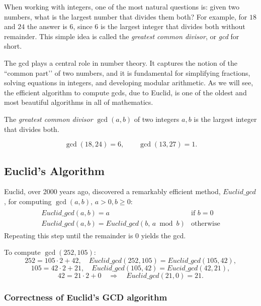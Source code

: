 When working with integers, one of the most natural questions is: given two numbers, 
what is the largest number that divides them both? For example, for $18$ and $24$ the answer is $6$, 
since $6$ is the largest integer that divides both without remainder. 
This simple idea is called the \emph{greatest common divisor}, or \emph{gcd} for short.

The gcd plays a central role in number theory. It captures the notion of 
the ``common part’’ of two numbers, and it is fundamental for simplifying fractions, 
solving equations in integers, and developing modular arithmetic. 
As we will see, the efficient algorithm to compute gcds, due to Euclid, 
is one of the oldest and most beautiful algorithms in all of mathematics.

\begin{definition}
The \emph{greatest common divisor} $\gcd(a,b)$ of two integers $a,b$ is the largest integer that divides both.
\end{definition}

\begin{example}
\[
\gcd(18,24)=6, \qquad \gcd(13,27)=1.
\]
\end{example}


\subsection{Euclid’s Algorithm}
Euclid, over 2000 years ago, discovered a remarkably efficient method, $Euclid\_gcd$, for computing $\gcd(a,b)$, $a > 0, b \geq 0$:
\begin{eqnarray*}
\begin{array}{ll}
Euclid\_gcd(a,b) = a & \mbox{if $b=0$} \\
Euclid\_gcd(a,b) = Euclid\_gcd(b,\, a \bmod b) & \mbox{otherwise}
\end{array}
\label{algo:Egcd}
\end{eqnarray*}
Repeating this step until the remainder is $0$ yields the gcd.

\begin{example}
To compute $\gcd(252,105)$:
\[
252=105\cdot2+42, \quad Euclid\_gcd(252,105)=Euclid\_gcd(105,42),
\]
\[
105=42\cdot2+21, \quad Euclid\_gcd(105,42)=Eucid\_gcd(42,21),
\]
\[
42=21\cdot2+0 \quad\Rightarrow\quad Euclid\_gcd(21,0) =21.
\]
\end{example}


\subsubsection{Correctness of Euclid's GCD algorithm}

